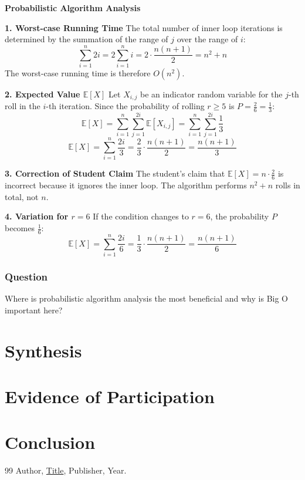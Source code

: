 \documentclass{article}
\theoremstyle{theorem}
\theoremstyle{definition}
\theoremstyle{remark}
\begin{document}
\textbf{Probabilistic Algorithm Analysis}

\textbf{1. Worst-case Running Time}
The total number of inner loop iterations is determined by the summation of the range of $j$ over the range of $i$:
\[ \sum_{i=1}^{n} 2i = 2 \sum_{i=1}^{n} i = 2 \cdot \frac{n(n+1)}{2} = n^2 + n \]
The worst-case running time is therefore \textbf{$O(n^2)$}.

\textbf{2. Expected Value $\mathbb{E}[X]$}
Let $X_{i,j}$ be an indicator random variable for the $j$-th roll in the $i$-th iteration. Since the probability of rolling $r \ge 5$ is $P = \frac{2}{6} = \frac{1}{3}$:
\[ \mathbb{E}[X] = \sum_{i=1}^n \sum_{j=1}^{2i} \mathbb{E}[X_{i,j}] = \sum_{i=1}^n \sum_{j=1}^{2i} \frac{1}{3} \]
\[ \mathbb{E}[X] = \sum_{i=1}^n \frac{2i}{3} = \frac{2}{3} \cdot \frac{n(n+1)}{2} = \frac{n(n+1)}{3} \]

\textbf{3. Correction of Student Claim}
The student's claim that $\mathbb{E}[X] = n \cdot \frac{2}{6}$ is incorrect because it ignores the inner loop. The algorithm performs $n^2+n$ rolls in total, not $n$.

\textbf{4. Variation for $r = 6$}
If the condition changes to $r = 6$, the probability $P$ becomes $\frac{1}{6}$:
\[ \mathbb{E}[X] = \sum_{i=1}^n \frac{2i}{6} = \frac{1}{3} \cdot \frac{n(n+1)}{2} = \frac{n(n+1)}{6} \]

\subsubsection{Question}
Where is probabilistic algorithm analysis the most beneficial and why is Big O important here?

\section{Synthesis}

\section{Evidence of Participation}

\section{Conclusion}\label{conclusion}

\begin{thebibliography}{99}
 Author, \href{https://en.wikipedia.org/wiki/LaTeX}{Title}, Publisher, Year.
\end{thebibliography}
\end{document}
